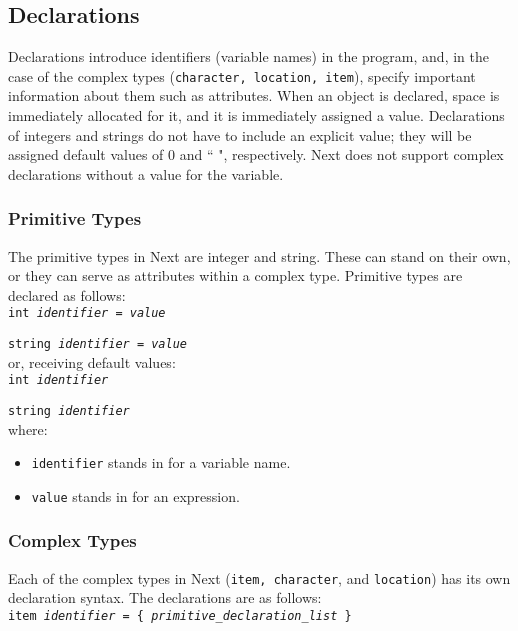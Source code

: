 \documentclass[12pt]{article}
\begin{document}
\subsection{Declarations}
Declarations introduce identifiers (variable names) in the program, and, in the case of the complex types (\texttt{character, location, item}), specify important information about them such as attributes.  When an object is declared, space is immediately allocated for it, and it is immediately assigned a value.  Declarations of integers and strings do not have to include an explicit value; they will be assigned default values of 0 and `` ", respectively.  Next does not support complex declarations without a value for the variable.

\subsubsection{Primitive Types}
The primitive types in Next are integer and string.  These can stand on their own, or they can serve as attributes within a complex type.  Primitive types are declared as follows: \\

\texttt{int \textit{identifier} = \textit{value}}

\texttt{string \textit{identifier} = \textit{value}} \\ 

\noindent or, receiving default values: \\

\texttt{int \textit{identifier}}

\texttt{string \textit{identifier}} \\ 

\noindent where:
\begin{itemize}
\item \texttt{identifier} stands in for a variable name.
\item \texttt{value} stands in for an expression.
\end{itemize}

\subsubsection{Complex Types}
Each of the complex types in Next (\texttt{item, character}, and \texttt{location}) has its own declaration syntax.  The declarations are as follows: \\

\texttt{item \textit{identifier} = \{ \textit{primitive\_declaration\_list} \}} \\
\end{document}
